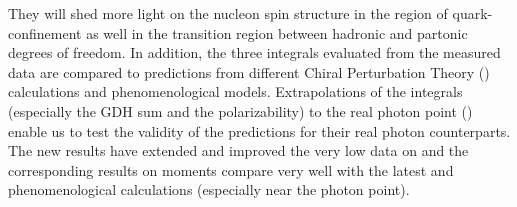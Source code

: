 {They will shed more light on the nucleon spin structure in the region of quark-confinement as well in the transition region between hadronic and partonic degrees of freedom. In addition, the three integrals evaluated from the measured data are compared to %
 predictions from different %
Chiral Perturbation Theory (\chipt) calculations and phenomenological models. %
Extrapolations of the integrals (especially the GDH sum and the polarizability) to the real photon point () %
enable us to test the validity of the predictions for %
their real photon counterparts. %
The new results have extended and improved the very low \qsqs data on \gones and the corresponding results on moments compare very well with the latest \chipts and phenomenological calculations (especially near the photon point). %
}
